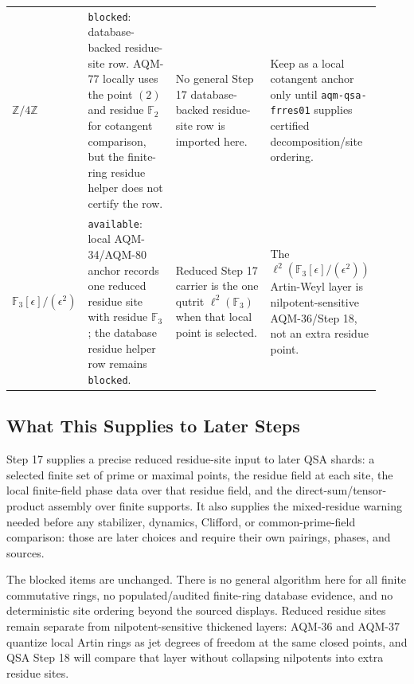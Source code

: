 \begin{center}
\begin{tabular}{p{0.17\linewidth}p{0.25\linewidth}p{0.28\linewidth}p{0.22\linewidth}}
\addlinespace
\(\mathbb Z/4\mathbb Z\) &
\texttt{blocked}: database-backed residue-site row.  AQM-77 locally uses the
point \((2)\) and residue
\(\mathbb F_2\) for cotangent comparison, but the finite-ring residue helper
does not certify the row. &
No general Step 17 database-backed residue-site row is imported here. &
Keep as a local cotangent anchor only until \texttt{aqm-qsa-frres01} supplies
certified decomposition/site ordering. \\
\addlinespace
\(\mathbb F_3[\epsilon]/(\epsilon^2)\) &
\texttt{available}: local AQM-34/AQM-80 anchor records one reduced residue site
with residue \(\mathbb F_3\); the database residue helper row remains
\texttt{blocked}. &
Reduced Step 17 carrier is the one qutrit \(\ell^2(\mathbb F_3)\) when that
local point is selected. &
The \(\ell^2(\mathbb F_3[\epsilon]/(\epsilon^2))\) Artin-Weyl layer is
nilpotent-sensitive AQM-36/Step 18, not an extra residue point. \\
\bottomrule
\end{tabular}
\end{center}

\subsection{What This Supplies to Later Steps}

Step 17 supplies a precise reduced residue-site input to later QSA shards:
a selected finite set of prime or maximal points, the residue field at each
site, the local finite-field phase data over that residue field, and the
direct-sum/tensor-product assembly over finite supports.  It also supplies
the mixed-residue warning needed before any stabilizer, dynamics, Clifford,
or common-prime-field comparison: those are later choices and require their
own pairings, phases, and sources.

The blocked items are unchanged.  There is no general algorithm here for all
finite commutative rings, no populated/audited finite-ring database evidence,
and no deterministic site ordering beyond the sourced displays.  Reduced
residue sites remain separate from nilpotent-sensitive thickened layers:
AQM-36 and AQM-37 quantize local Artin rings as jet degrees of freedom at the
same closed points, and QSA Step 18 will compare that layer without
collapsing nilpotents into extra residue sites.
